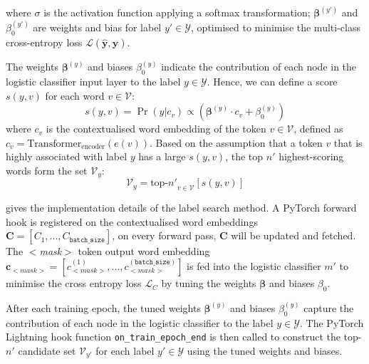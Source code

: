 where $\sigma$ is the activation function applying a softmax transformation; $\boldsymbol{\beta}^{(y')}$ and $\beta_0^{(y')}$ are weights and bias for label $y' \in  \mathcal{Y}$, optimised to minimise the multi-class cross-entropy loss $\mathcal{L}(\hat{\mathbf{y}}, \mathbf{y})$. 

The weights $\boldsymbol{\beta}^{(y)}$  and biases $\beta_0^{(y)}$ indicate the contribution of each node in the logistic classifier input layer to the label $y \in \mathcal{Y}$. Hence, we can define a score $s(y,v)$ for each word $v \in \mathcal{V}$: 
\begin{equation}
    s(y, v) = \Pr(y|c_v) \propto (\boldsymbol{\beta}^{(y)} \cdot c_v  + \beta_0^{(y)})
\end{equation}
where $c_v$ is the contextualised word embedding of the token $v \in \mathcal{V}$, defined as $c_v = \text{Transformer}_{\text{encoder}}(e(v))$. Based on the assumption that a token $v$ that is highly associated with label $y$ has a large $s(y,v)$, the top $n'$ highest-scoring words form the set $\mathcal{V}_y$:
\begin{equation}
    \mathcal{V}_y = {\text{top-}n'}_{v \in \mathcal{V}}[s(y,v)]
\end{equation}

 gives the implementation details of the label search method. A PyTorch forward hook is registered on the contextualised word embeddings $\textbf{C} = [C_1, ..., C_{\texttt{batch\_size}}]$, on every forward pass, $\textbf{C}$ will be updated and fetched. The $<$\textit{mask}$>$ token output word embedding $\textbf{c}_{<\textit{mask}>} = [c_{<\textit{mask}>}^{(1)}, ..., c_{<\textit{mask}>}^{(\texttt{batch\_size})}]$ is fed into the logistic classifier $m'$ to minimise the cross entropy loss $\mathcal{L}_C$ by tuning the weights $\boldsymbol{\beta}$ and biases $\beta_0$. 

After each training epoch, the tuned weights $\boldsymbol{\beta}^{(y)}$ and biases $\beta_0^{(y)}$ capture the contribution of each node in the logistic classifier to the label $y \in \mathcal{Y}$. The PyTorch Lightning hook function \texttt{on\_train\_epoch\_end} is then called to construct the top-$n'$ candidate set $\mathcal{V}_{y'}$ for each label $y' \in \mathcal{Y}$ using the tuned weights and biases.


